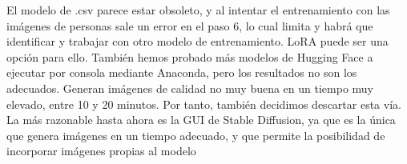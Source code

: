 El modelo de .csv parece estar obsoleto, y al intentar el entrenamiento con las imágenes de personas sale un error en el paso 6, lo cual limita y habrá que identificar y trabajar con otro modelo de entrenamiento. LoRA puede ser una opción para ello.
También hemos probado más modelos de Hugging Face a ejecutar por consola mediante Anaconda, pero los resultados no son los adecuados. Generan imágenes de calidad no muy buena en un tiempo muy elevado, entre 10 y 20 minutos. Por tanto, también decidimos descartar esta vía. 
La más razonable hasta ahora es la GUI de Stable Diffusion, ya que es la única que genera imágenes en un tiempo adecuado, y que permite la posibilidad de incorporar imágenes propias al modelo\\

